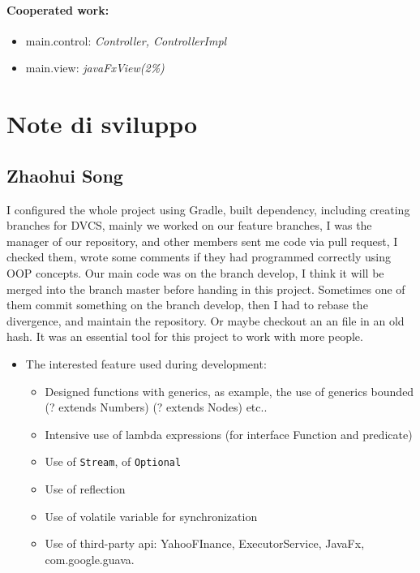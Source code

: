 \documentclass[a4paper,12pt]{report}
\begin{document}
\paragraph*{Cooperated work:}
\begin{itemize}
    \item main.control: \textit{Controller, ControllerImpl}
    \item main.view: \textit{javaFxView(2\%)}
\end{itemize}

\section{Note di sviluppo}

\subsection{Zhaohui Song}
I configured the whole project using Gradle, built dependency, including creating branches for DVCS, 
%
mainly we worked on our feature branches, I was the manager of our repository, and other members sent me code via pull request, I checked them, wrote some comments if they had programmed correctly using OOP concepts. 
%
Our main code was on the branch develop, I think it will be merged into the branch master before handing in this project.
%
Sometimes one of them commit something on the branch develop, then I had to rebase the divergence, and maintain the repository. Or maybe checkout an an file in an old hash. It was an essential tool for this project to work with more people. 

\begin{itemize}
    \item The interested feature used during development:
    \begin{itemize}
        \item Designed functions with generics, as example, the use of generics bounded (? extends Numbers) (? extends Nodes) etc..
        \item Intensive use of lambda expressions (for interface Function and predicate)
        \item Use of \texttt{Stream}, of \texttt{Optional} 
        \item Use of reflection
        \item Use of volatile variable for synchronization
        \item Use of third-party api: YahooFInance, ExecutorService, JavaFx, com.google.guava.
    \end{itemize}
\end{itemize}
\end{document}
